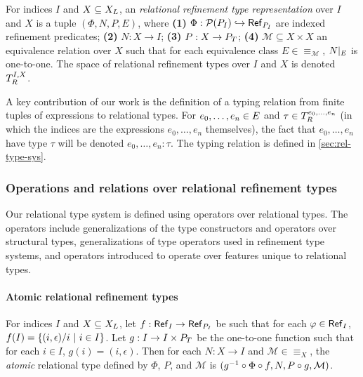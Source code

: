 For indices $I$ and $X \subseteq X_L$, an \emph{relational
  refinement type representation} over $I$ and $X$ is a tuple
$(\Phi, N, P, E)$, where
\textbf{(1)}
$\Phi : \mathcal{P}(P_{I}) \hookrightarrow \mathsf{Ref}_{ P_{I} }$ are indexed
refinement predicates;
%
\textbf{(2)} $N : X \to I$;
%
\textbf{(3)} $P : X \to P_T$;
%
\textbf{(4)} $\mathcal{M} \subseteq X \times X$ an equivalence
relation over $X$ such that for each equivalence class
$E \in \equiv_{\mathcal{M}}$, $N|_{E}$ is one-to-one.
%
The space of relational refinement types over $I$ and $X$ is denoted
$T_{R}^{I, X}$.

A key contribution of our work is the definition of a typing relation
from finite tuples of expressions to relational types.
%
For $e_0, \ldots, e_n \in E$ and
$\tau \in T_{R}^{e_0, \ldots, e_n}$ (in which the indices are the
expressions $e_0, \ldots, e_n$ themselves), the fact that
$e_0, \ldots, e_n$ have type $\tau$ will be denoted
$e_0, \ldots, e_n : \tau$.
%
The typing relation is defined in \autoref{sec:rel-type-sys}.

\subsubsection{Operations and relations over relational refinement types}
\label{sec:rel-type-ops}
Our relational type system is defined using operators over relational
types.
%
The operators include generalizations of the type constructors and
operators over structural types, generalizations of type operators
used in refinement type systems, and operators introduced to operate
over features unique to relational types.

\paragraph{Atomic relational refinement types}
%
For indices $I$ and $X \subseteq X_L$, let
$f : \mathsf{Ref}_{I} \to \mathsf{Ref}_{P_{I} }$ be such that for each
$\varphi \in \mathsf{Ref}_{I}$,
$f(I) = \{  (i, \epsilon) / i \ |\  i \in I  \}$.
%
Let $g : I \to I \times P_T$ be the one-to-one function such that
for each $i \in I$, $g(i) = (i, \epsilon)$.
%
Then for each $N : X \to I$ and $\mathcal{M} \in \equiv_X$, the
\emph{atomic} relational type defined by $\Phi$, $P$, and
$\mathcal{M}$ is
$(g^{-1} \circ \Phi \circ f, N, P \circ g, \mathcal{M})$.

